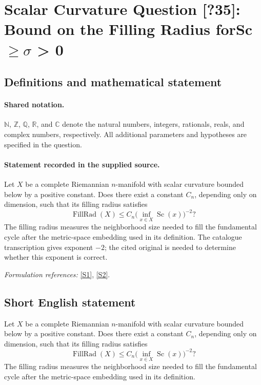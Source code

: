 \documentclass[11pt]{article}
\newcommand{\sref}[2]{\hyperlink{source:#1:#2}{[S#2]}}
\begin{document}
\section{\texorpdfstring{Scalar Curvature Question [?35]: Bound on the Filling Radius forSc $\geq\sigma$ > 0}{Scalar Curvature Question [?35]: Bound on the Filling Radius forSc ≥σ > 0}}\label{statement}

\subsection{Definitions and mathematical statement}

\paragraph{Shared notation.}$\mathbb N$, $\mathbb Z$, $\mathbb Q$, $\mathbb R$, and $\mathbb C$ denote the natural numbers, integers, rationals, reals, and complex numbers, respectively. All additional parameters and hypotheses are specified in the question.


\paragraph{Statement recorded in the supplied source.}
Let $X$ be a complete Riemannian $n$-manifold with scalar curvature bounded below by a positive constant. Does there exist a constant $C_n$, depending only on dimension, such that its filling radius satisfies
\[\operatorname{FillRad}(X)\leq C_n\bigl(\inf_{x\in X}\operatorname{Sc}(x)\bigr)^{-2}?\]
The filling radius measures the neighborhood size needed to fill the fundamental cycle after the metric-space embedding used in its definition.
The catalogue transcription gives exponent $-2$; the cited original is needed to determine whether this exponent is correct.
\par\smallskip\textit{Formulation references:} \sref{statement}{1}, \sref{statement}{2}.
\subsection{Short English statement}
Let $X$ be a complete Riemannian $n$-manifold with scalar curvature bounded below by a positive constant. Does there exist a constant $C_n$, depending only on dimension, such that its filling radius satisfies
\[\operatorname{FillRad}(X)\leq C_n\bigl(\inf_{x\in X}\operatorname{Sc}(x)\bigr)^{-2}?\]
The filling radius measures the neighborhood size needed to fill the fundamental cycle after the metric-space embedding used in its definition.
\end{document}
